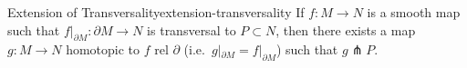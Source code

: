 \begin{corollary}{Extension of Transversality}{extension-transversality}
    If $f \colon M \to N$ is a smooth map such that $f|_{\partial M} \colon \partial M \to N$ is transversal to $P \subset N$, then there exists a map $g \colon M \to N$ homotopic to $f$ rel $\partial$ (i.e.\ $g|_{\partial M} = f|_{\partial M}$) such that $g \pitchfork P$.
\end{corollary}
